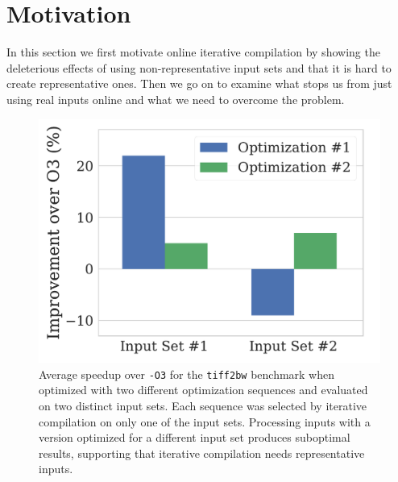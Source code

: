 \section{Motivation \label{sec:motivation}}


    In this section we first motivate online iterative compilation by showing the deleterious effects of using non-representative input
    sets and that it is hard to create representative ones. Then we go on to examine what stops us from just using real inputs online and
    what we need to overcome the problem.

    \begin{figure}[t]
        \centering
        \includegraphics[width=0.7\linewidth]{figs/motivation_two_inputs.pdf}
        \caption{Average speedup over \texttt{-O3} for the \texttt{tiff2bw} benchmark when optimized with two different optimization sequences and
        evaluated on two distinct input sets. Each sequence was selected by iterative compilation on only one of the input sets. Processing
        inputs with a version optimized for a different input set produces suboptimal results, supporting that iterative compilation needs
        representative inputs.}
        \label{fig:motivation_wrong_inputs}
    \end{figure}

